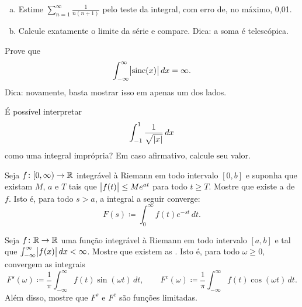\begin{exercise}
\leavevmode
\begin{enumerate}[a)]
\item
Estime $\sum_{n=1}^\infty \frac{1}{n(n+1)}$ pelo teste da integral, com
erro de, no máximo, 0,01.
\item
Calcule exatamente o limite da série e compare. Dica: a soma é telescópica.
\end{enumerate}
\end{exercise}

\begin{exercise}
Prove que
\begin{equation*}
\int_{-\infty}^\infty \bigl\lvert {\operatorname{sinc}(x)} \bigr\rvert\,dx = \infty .
\end{equation*}
Dica: novamente, basta mostrar isso em apenas um dos lados.
\end{exercise}

\begin{exercise}
É possível interpretar
\begin{equation*}
\int_{-1}^1 \frac{1}{\sqrt{\lvert {x} \rvert}}\,dx
\end{equation*}
como uma integral imprópria? Em caso afirmativo, calcule seu valor.
\end{exercise}

\begin{exercise}
Seja $f \colon [0,\infty) \to {\mathbb{R}}$ integrável à Riemann em todo intervalo
$[0,b]$ e suponha que existam $M$, $a$ e $T$ tais que
$\bigl\lvert {f(t)} \bigr\rvert \leq M e^{at}$ para todo $t\geq T$. Mostre que existe a
\emph{} de $f$. Isto é, para todo $s>a$,
a integral a seguir converge:
\begin{equation*}
F(s) \coloneqq \int_{0}^\infty f(t) e^{-st} \,dt .
\end{equation*}
\end{exercise}

\begin{exercise}
Seja $f \colon {\mathbb{R}} \to {\mathbb{R}}$ uma função integrável à Riemann em todo intervalo
$[a,b]$ e tal que $\int_{-\infty}^\infty \bigl\lvert {f(x)} \bigr\rvert\,dx < \infty$.
Mostre que existem as \emph{}.
Isto é, para todo $\omega\geq0$, convergem as integrais
\begin{equation*}
F^s(\omega) \coloneqq \frac{1}{\pi} \int_{-\infty}^\infty f(t) \sin(\omega t) \,dt ,
\qquad
F^c(\omega) \coloneqq \frac{1}{\pi} \int_{-\infty}^\infty f(t) \cos(\omega t) \,dt .
\end{equation*}
Além disso, mostre que $F^s$ e $F^c$ são funções limitadas.
\end{exercise}

